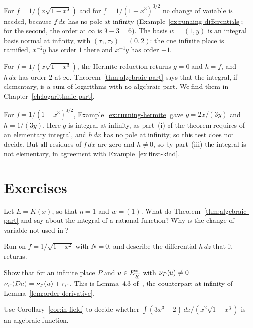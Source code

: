\begin{example}\label{ex:running-algpart-2}
For $f = 1/(x \sqrt{1 - x^3})$ and for $f = 1/(1 - x^3)^{3/2}$ no change of
variable is needed, because $f\,dx$ has no pole at infinity
(Example~\ref{ex:running-differentials}; for the second, the order at
$\infty$ is $9 - 3 = 6$). The basis $w = (1, y)$ is an integral basis normal
at infinity, with $(\tau_1, \tau_2) = (0, 2)$: the one infinite place is
ramified, $x^{-2} y$ has order $1$ there and $x^{-1} y$ has order $-1$.

For $f = 1/(x\sqrt{1 - x^3})$, the Hermite reduction returns $g = 0$ and $h =
f$, and $h\,dx$ has order $2$ at $\infty$. Theorem~\ref{thm:algebraic-part}
says that the integral, if elementary, is a sum of logarithms with no
algebraic part. We find them in Chapter~\ref{ch:logarithmic-part}.

For $f = 1/(1 - x^3)^{3/2}$, Example~\ref{ex:running-hermite} gave $g =
2x/(3y)$ and $h = 1/(3y)$. Here $g$ is integral at infinity, as part~(i) of
the theorem requires of an elementary integral, and $h\,dx$ has no pole at
infinity; so this test does not decide. But all residues of $f\,dx$ are
zero and $h \ne 0$, so by part~(iii) the integral is not elementary, in
agreement with Example~\ref{ex:first-kind}.
\end{example}

\section*{Exercises}

\begin{exercise}
Let $E = K(x)$, so that $n = 1$ and $w = (1)$. What do
Theorem~\ref{thm:algebraic-part} and  say about the
integral of a rational function? Why is the change of variable not used in
?
\end{exercise}

\begin{exercise}
Run  on $f = 1/\sqrt{1 - x^2}$ with $N = 0$, and
describe the differential $h\,dz$ that it returns.
\end{exercise}

\begin{exercise}
Show that for an infinite place $P$ and $u \in E_{\overline{K}}^*$ with $\nu_{P}(u)
\ne 0$, $\nu_{P}(Du) = \nu_{P}(u) + r_P$. This is Lemma~4.3
of~\cite{trager1984}, the counterpart at infinity of
Lemma~\ref{lem:order-derivative}.
\end{exercise}

\begin{exercise}
Use Corollary~\ref{cor:in-field} to decide whether $\int (3x^3 - 2)\,dx /
(x^2 \sqrt{1 - x^3})$ is an algebraic function.
\end{exercise}
